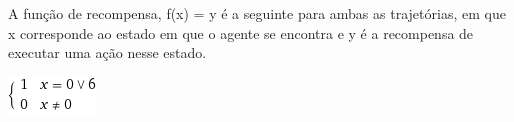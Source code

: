 \documentclass[11pt,twocolumn]{article}
\begin{document}
A função de recompensa, f(x) = y é a seguinte para ambas as trajetórias, em que x corresponde ao estado 
em que o agente se encontra e y é a recompensa de executar uma ação nesse estado.\par

\begin{center}
    \includegraphics[scale=0.6]{piece1.png}
\end{center}
\end{document}
